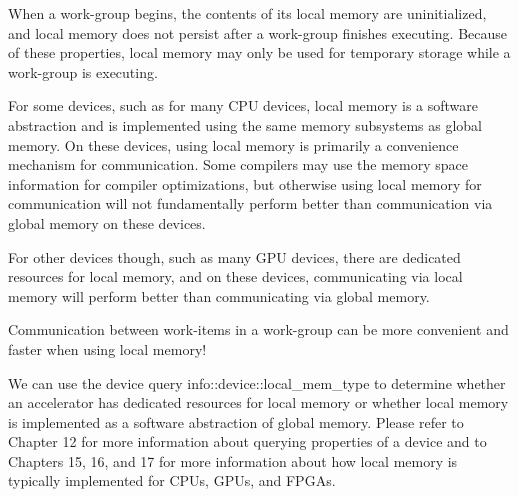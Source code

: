 When a work-group begins, the contents of its local memory are uninitialized, and local memory does not persist after a work-group finishes executing. Because of these properties, local memory may only be used for temporary storage while a work-group is executing.\par

For some devices, such as for many CPU devices, local memory is a software abstraction and is implemented using the same memory subsystems as global memory. On these devices, using local memory is primarily a convenience mechanism for communication. Some compilers may use the memory space information for compiler optimizations, but otherwise using local memory for communication will not fundamentally perform better than communication via global memory on these devices.\par

For other devices though, such as many GPU devices, there are dedicated resources for local memory, and on these devices, communicating via local memory will perform better than communicating via global memory.\par

\begin{tcolorbox}[colback=red!5!white,colframe=red!75!black]
Communication between work-items in a work-group can be more convenient and faster when using local memory!
\end{tcolorbox}

We can use the device query info::device::local\_mem\_type to determine whether an accelerator has dedicated resources for local memory or whether local memory is implemented as a software abstraction of global memory. Please refer to Chapter 12 for more information about querying properties of a device and to Chapters 15, 16, and 17 for more information about how local memory is typically implemented for CPUs, GPUs, and FPGAs.\par





































